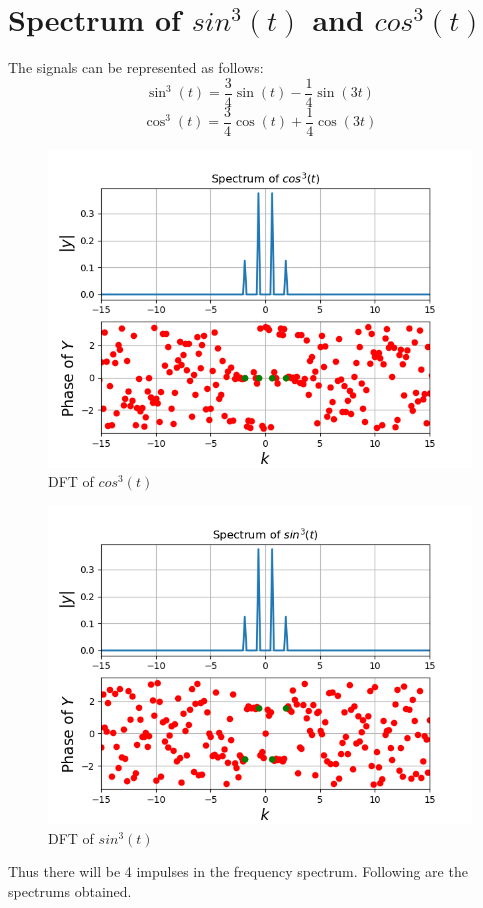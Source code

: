 \documentclass[11pt, a4paper]{article}
\begin{document}
\section{Spectrum of $sin^3(t)$ and $cos^3(t)$}
The signals can be represented as follows:
\begin{equation}
\sin^3(t) = \frac{3}{4}\sin(t) - \frac{1}{4}\sin(3t)
\end{equation}
\begin{equation}
\cos^3(t) = \frac{3}{4}\cos(t) + \frac{1}{4}\cos(3t)
\end{equation}
\begin{figure}[!tbh]
   	\centering
   	\includegraphics[scale=0.5]{fig2.png}  %
   	\caption{DFT of $cos^3(t)$}
   	\label{fig:sample}
   \end{figure} 
 \begin{figure}[!tbh]
   	\centering
   	\includegraphics[scale=0.5]{fig3.png}  %
   	\caption{DFT of $sin^3(t)$}
   	\label{fig:sample}
   \end{figure} 
Thus there will be 4 impulses in the frequency spectrum. Following are the spectrums obtained.
\end{document}

